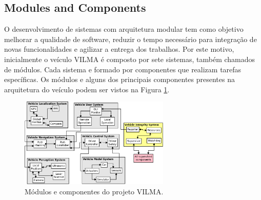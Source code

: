 \documentclass[conference]{IEEEtran}
\begin{document}



%
\subsection{Modules and Components}\label{subsec:modules_components}
O desenvolvimento de sistemas com arquitetura modular tem como objetivo melhorar a qualidade de software, reduzir o tempo necessário para integração de novas funcionalidades e agilizar a entrega dos trabalhos. Por este motivo, inicialmente o veículo VILMA é composto por sete sistemas, também chamados de módulos. Cada sistema e formado por componentes que realizam tarefas específicas. Os módulos e alguns dos principais componentes presentes na arquitetura do veículo podem ser vistos na Figura \ref{fig:VILMA_MODULES_COMPONENTS}.

\begin{figure}[h]
	\centering
	\includegraphics[width=270px,keepaspectratio]{imagens/VILMA_MODULES_COMPONENTS}
	\caption{Módulos e componentes do projeto VILMA.}
	\label{fig:VILMA_MODULES_COMPONENTS}
\end{figure}
\end{document}
